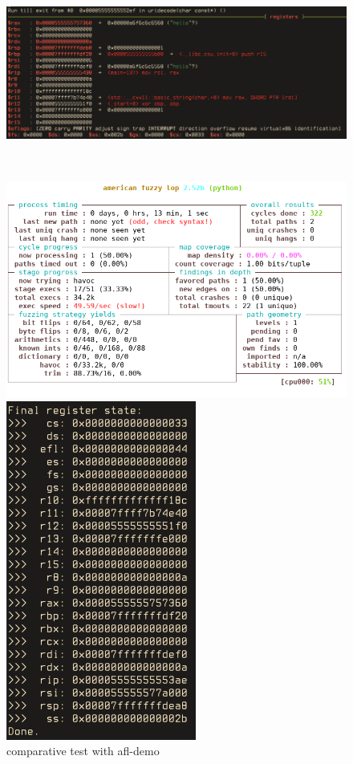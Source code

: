 \documentclass[../main.tex]{subfiles}
\begin{document}
\begin{figure}[htp]
\centering
\begin{minipage}{1.0\textwidth}
  \centering
  \includegraphics[scale=0.67]{images/gdb_afl-test_unicorn.png}
\end{minipage}\\
\begin{minipage}{.5\textwidth}
  \flushleft
  \includegraphics[scale=0.6]{images/aflunicorn_no_crash.png}
\end{minipage}%
\begin{minipage}{.5\textwidth}
  \hspace*{3.9cm}
  \includegraphics[scale=0.63]{images/unicorn_afl-test.png}
\end{minipage}
\caption{comparative test with afl-demo}
\label{fig:afldemo}
\end{figure}
\end{document}
